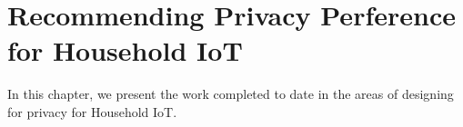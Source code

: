 \chapter{Recommending Privacy Perference for Household IoT}
In this chapter, we present the work completed to date in the areas of designing for privacy for Household IoT.